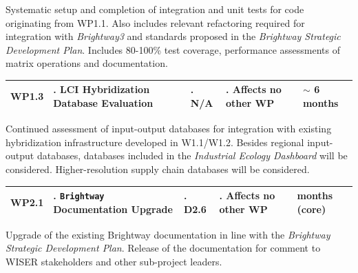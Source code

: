 \documentclass{article}
\begin{document}
    Systematic setup and completion of integration and unit tests for code originating from WP1.1. Also includes relevant refactoring required for integration with \textit{Brightway3} and standards proposed in the \textit{Brightway Strategic Development Plan}. Includes 80-100\% test coverage, performance assessments of matrix operations and documentation.

    \begin{table}[H]
        \centering
        \begin{tabularx}{\linewidth}{
            |>{\hsize=0.25\hsize}X
            |>{\hsize=1.\hsize}X
            |>{\hsize=1.\hsize}X
            |>{\hsize=1.\hsize}X
            |>{\hsize=0.75\hsize}X|
          } %
            \hline
                WP1.3
            &
                LCI Hybridization Database Evaluation
            &
                N/A
            &
                Affects no other WP
            &
                $\sim$ 6 months
            \\
            \hline
        \end{tabularx}
    \end{table}
    
    Continued assessment of input-output databases for integration with existing hybridization infrastructure developed in W1.1/W1.2. Besides regional input-output databases, databases included in the \textit{Industrial Ecology Dashboard} will be considered. Higher-resolution supply chain databases will be considered.
    
    \begin{table}[H]
        \centering
        \begin{tabularx}{\linewidth}{
            |>{\hsize=0.25\hsize}X
            |>{\hsize=1.\hsize}X
            |>{\hsize=1.\hsize}X
            |>{\hsize=1.\hsize}X
            |>{\hsize=0.75\hsize}X|
          } %
            \hline
                WP2.1
            &
                \texttt{Brightway} Documentation Upgrade
            &
                D2.6
            &
                Affects no other WP
            &
                3 months (core)
            \\
            \hline
        \end{tabularx}
    \end{table}
    
    Upgrade of the existing Brightway documentation in line with the \textit{Brightway Strategic Development Plan}. Release of the documentation for comment to WISER stakeholders and other sub-project leaders.
    
\end{document}
